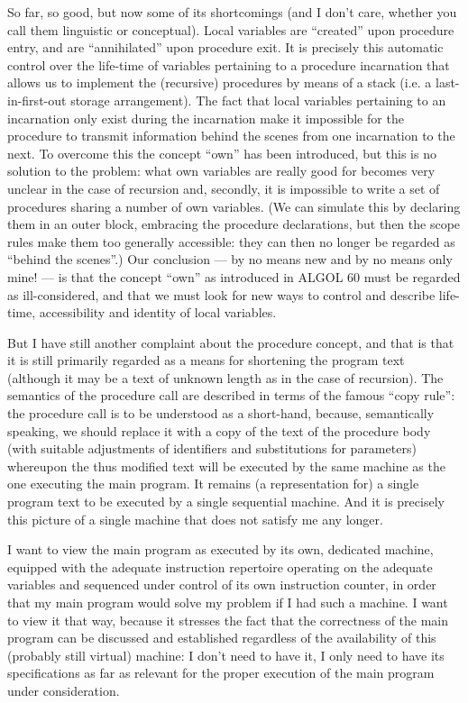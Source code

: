 So far, so good, but now some of its shortcomings (and I don't care, whether you call them linguistic or conceptual). Local variables are ``created'' upon procedure entry, and are ``annihilated'' upon procedure exit. It is precisely this automatic control over the life-time of variables pertaining to a procedure incarnation that allows us to implement the (recursive) procedures by means of a stack (i.e. a last-in-first-out storage arrangement). The fact that local variables pertaining to an incarnation only exist during the incarnation make it impossible for the procedure to transmit information behind the scenes from one incarnation to the next. To overcome this the concept ``own'' has been introduced, but this is no solution to the problem: what own variables are really good for becomes very unclear in the case of recursion and, secondly, it is impossible to write a set of procedures sharing a number of own variables. (We can simulate this by declaring them in an outer block, embracing the procedure declarations, but then the scope rules make them too generally accessible: they can then no longer be regarded as ``behind the scenes''.) Our conclusion --- by no means new and by no means only mine! --- is that the concept ``own'' as introduced in ALGOL 60 must be regarded as ill-considered, and that we must look for new ways to control and describe life-time, accessibility and identity of local variables.

But I have still another complaint about the procedure concept, and that is that it is still primarily regarded as a means for shortening the program text (although it may be a text of unknown length as in the case of recursion). The semantics of the procedure call are described in terms of the famous ``copy rule'': the procedure call is to be understood as a short-hand, because, semantically speaking, we should replace it with a copy of the text of the procedure body (with suitable adjustments of identifiers and substitutions for parameters) whereupon the thus modified text will be executed by the same machine as the one executing the main program. It remains (a representation for) a single program text to be executed by a single sequential machine. And it is precisely this picture of a single machine that does not satisfy me any longer.

I want to view the main program as executed by its own, dedicated machine, equipped with the adequate instruction repertoire operating on the adequate variables and sequenced under control of its own instruction counter, in order that my main program would solve my problem if I had such a machine. I want to view it that way, because it stresses the fact that  the correctness of the main program can be discussed and established regardless of the availability of this (probably still virtual) machine: I don't
need to have it, I only need to have its specifications as far as relevant for the proper execution of the main program under consideration.

